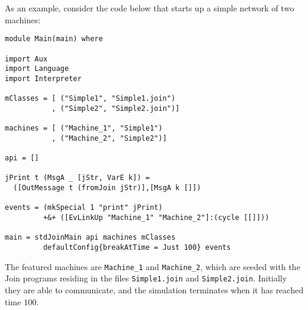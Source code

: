 As an example, consider the code below that starts up a simple network of two
machines:
\begin{verbatim}
module Main(main) where

import Aux
import Language
import Interpreter

mClasses = [ ("Simple1", "Simple1.join")
           , ("Simple2", "Simple2.join")]

machines = [ ("Machine_1", "Simple1")
           , ("Machine_2", "Simple2")]

api = []

jPrint t (MsgA _ [jStr, VarE k]) =
  ([OutMessage t (fromJoin jStr)],[MsgA k []])

events = (mkSpecial 1 "print" jPrint)
         +&+ ([EvLinkUp "Machine_1" "Machine_2"]:(cycle [[]]))

main = stdJoinMain api machines mClasses
         defaultConfig{breakAtTime = Just 100} events
\end{verbatim}

The featured machines are \texttt{Machine\_1} and \texttt{Machine\_2}, which are
seeded with the Join programs residing in the files \texttt{Simple1.join} and
\texttt{Simple2.join}. Initially they are able to communicate, and the
simulation terminates when it has reached time $100$.

